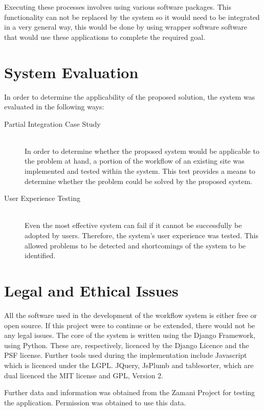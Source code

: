     Executing these processes involves using various software packages.
    This functionality can not be replaced by the system so it would need
    to be integrated in a very general way, this would be done by using wrapper
    software software that would use these applications to complete the required goal.

\section{System Evaluation}
    In order to determine the applicability of the proposed solution, the system
    was evaluated in the following ways:

    \begin{description}
        \item[Partial Integration Case Study]\hfill \\
            In order to determine whether the proposed system
            would be applicable to the problem at hand, a portion of the workflow
            of an existing site was implemented and tested within the system. This
            test provides a means to determine whether the problem could be solved
            by the proposed system.
        \item[User Experience Testing] \hfill \\
            Even the most effective system can fail if it cannot
            be successfully be adopted by users. Therefore, the system's
            user experience was tested. This allowed problems to be detected and
            shortcomings of the system to be identified\cite{tullis2008measuring}.
    \end{description}

\section{Legal and Ethical Issues}
    All the software used in the development of the workflow system
    is either free or open source. If this project were to continue
    or be extended, there would not be any legal issues. The core
    of the system is written using the Django Framework, using Python.
    These are, respectively, licenced by the Django Licence and the PSF
    license. Further tools used during the implementation include Javascript
    which is licenced under the LGPL.
    JQuery, JsPlumb and tablesorter, which are dual licenced the  MIT license
    and GPL, Version 2.

    Further data and information was obtained from the Zamani Project for
    testing the application. Permission was obtained to use this data.

